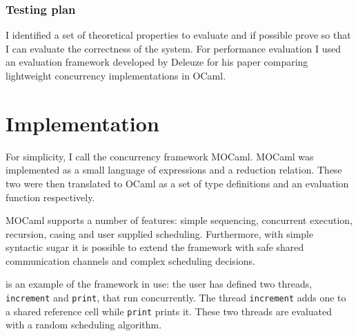 \documentclass[12pt,twoside,notitlepage]{report}
\theoremstyle{plain}%
\theoremstyle{definition}
\theoremstyle{remark}
\begin{document}
\subsection{Testing plan}
I identified a set of theoretical properties to evaluate and if possible prove so that I can evaluate the correctness of the system. For performance evaluation I used an evaluation framework developed by Deleuze for his paper comparing lightweight concurrency implementations in OCaml\cite{deleuzelight}.

\cleardoublepage
\chapter{Implementation}
For simplicity, I call the concurrency framework MOCaml. MOCaml was implemented as a small language of expressions and a reduction relation.  These two were then translated to OCaml as a set of type definitions and an evaluation function respectively. 

MOCaml supports a number of features: simple sequencing, concurrent execution, recursion, casing and user supplied scheduling. Furthermore, with simple syntactic sugar it is possible to extend the framework with safe shared communication channels and complex scheduling decisions. 

 is an example of the framework in use:  the user has defined two threads, \lstinline|increment| and \lstinline|print|, that run concurrently. The thread  \lstinline|increment| adds one to a shared reference cell while \lstinline|print| prints it. These two threads are evaluated with a random scheduling algorithm.
\end{document}
